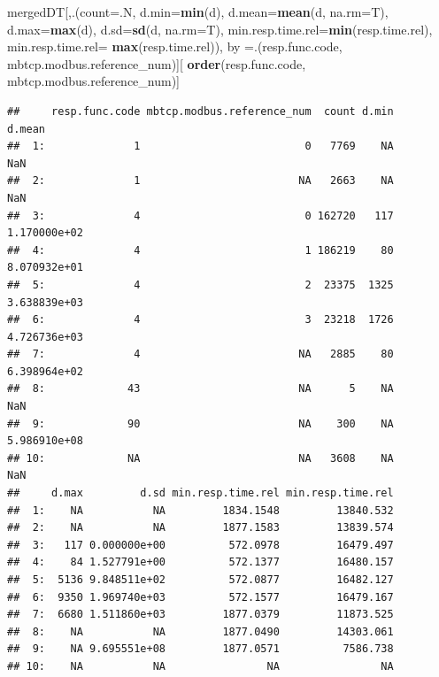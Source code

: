 \documentclass[]{article}
\newenvironment{Shaded}{\begin{snugshade}}{\end{snugshade}}
\newcommand{\KeywordTok}[1]{\textcolor[rgb]{0.13,0.29,0.53}{\textbf{{#1}}}}
\newcommand{\DataTypeTok}[1]{\textcolor[rgb]{0.13,0.29,0.53}{{#1}}}
\newcommand{\NormalTok}[1]{{#1}}
\begin{document}
\begin{Shaded}
\begin{Highlighting}[]
\NormalTok{mergedDT[,.(}\DataTypeTok{count=}\NormalTok{.N, }\DataTypeTok{d.min=}\KeywordTok{min}\NormalTok{(d), }\DataTypeTok{d.mean=}\KeywordTok{mean}\NormalTok{(d, }\DataTypeTok{na.rm=}\NormalTok{T), }\DataTypeTok{d.max=}\KeywordTok{max}\NormalTok{(d),}
            \DataTypeTok{d.sd=}\KeywordTok{sd}\NormalTok{(d, }\DataTypeTok{na.rm=}\NormalTok{T), }\DataTypeTok{min.resp.time.rel=}\KeywordTok{min}\NormalTok{(resp.time.rel),}
            \DataTypeTok{min.resp.time.rel=} \KeywordTok{max}\NormalTok{(resp.time.rel)), }
         \NormalTok{by =.(resp.func.code, mbtcp.modbus.reference_num)][}
           \KeywordTok{order}\NormalTok{(resp.func.code, mbtcp.modbus.reference_num)]}
\end{Highlighting}
\end{Shaded}

\begin{verbatim}
##     resp.func.code mbtcp.modbus.reference_num  count d.min       d.mean
##  1:              1                          0   7769    NA          NaN
##  2:              1                         NA   2663    NA          NaN
##  3:              4                          0 162720   117 1.170000e+02
##  4:              4                          1 186219    80 8.070932e+01
##  5:              4                          2  23375  1325 3.638839e+03
##  6:              4                          3  23218  1726 4.726736e+03
##  7:              4                         NA   2885    80 6.398964e+02
##  8:             43                         NA      5    NA          NaN
##  9:             90                         NA    300    NA 5.986910e+08
## 10:             NA                         NA   3608    NA          NaN
##     d.max         d.sd min.resp.time.rel min.resp.time.rel
##  1:    NA           NA         1834.1548         13840.532
##  2:    NA           NA         1877.1583         13839.574
##  3:   117 0.000000e+00          572.0978         16479.497
##  4:    84 1.527791e+00          572.1377         16480.157
##  5:  5136 9.848511e+02          572.0877         16482.127
##  6:  9350 1.969740e+03          572.1577         16479.167
##  7:  6680 1.511860e+03         1877.0379         11873.525
##  8:    NA           NA         1877.0490         14303.061
##  9:    NA 9.695551e+08         1877.0571          7586.738
## 10:    NA           NA                NA                NA
\end{verbatim}
\end{document}
